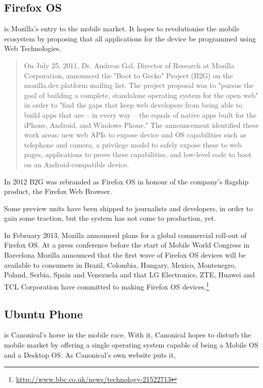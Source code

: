 \subsection{Firefox OS}
 is Mozilla's entry to the mobile market. It hopes to revolutionise the mobile ecosystem by proposing that all applications for the device be programmed using Web Technologies.

\begin{quotation}
On July 25, 2011, Dr. Andreas Gal, Director of Research at Mozilla Corporation, announced the "Boot to Gecko" Project (B2G) on the mozilla.dev.platform mailing list. The project proposal was to "pursue the goal of building a complete, standalone operating system for the open web" in order to "find the gaps that keep web developers from being able to build apps that are – in every way – the equals of native apps built for the iPhone, Android, and Windows Phone." The announcement identified these work areas: new web APIs to expose device and \ac{OS} capabilities such as telephone and camera, a privilege model to safely expose these to web pages, applications to prove these capabilities, and low-level code to boot on an Android-compatible device.
\cite{wikipedia:firefox}
\end{quotation}

In 2012 B2G was rebranded as Firefox OS in honour of the company's flagship product, the Firefox Web Browser.

Some preview units have been shipped to journalists and developers, in order to gain some traction, but the system has not come to production, yet. 

In February 2013, Mozilla announced plans for a global commercial roll-out of Firefox OS. At a press conference before the start of Mobile World Congress in Barcelona Mozilla announced that the first wave of Firefox OS devices will be available to consumers in Brazil, Colombia, Hungary, Mexico, Montenegro, Poland, Serbia, Spain and Venezuela and that LG Electronics, ZTE, Huawei and TCL Corporation have committed to making Firefox OS devices.\footnote{\url{http://www.bbc.co.uk/news/technology-21522713}}
 

\subsection{Ubuntu Phone}
 is Canonical's horse in the mobile race. With it, Canonical hopes to disturb the mobile market by offering a single operating system capable of being a Mobile \ac{OS} and a Desktop \ac{OS}. As Canonical's own website puts it, 

